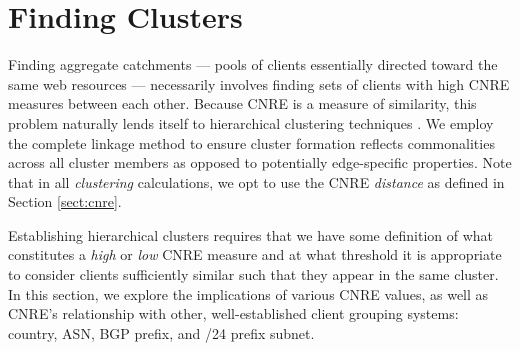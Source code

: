 
\begin{figure*}
    \caption{Dendrogram of CNRE distance across all client pairs}
\end{figure*}

\section{Finding Clusters} \label{sect:finding}

Finding aggregate catchments --- pools of clients essentially directed toward
the same web resources --- necessarily involves finding sets of clients with high
CNRE measures between each other. Because CNRE is a measure of similarity, this
problem naturally lends itself to hierarchical clustering techniques \cite{murtagh1983survey}. 
We employ the complete linkage method to ensure cluster formation reflects commonalities
across all cluster members as opposed to potentially edge-specific properties.
Note that in all \emph{clustering} calculations, we opt to use the CNRE \emph{distance}
as defined in Section \ref{sect:cnre}.

Establishing hierarchical clusters requires that we have some definition of what
constitutes a \emph{high} or \emph{low} CNRE measure and at what threshold it is
appropriate to consider clients sufficiently similar such that they appear in
the same cluster. In this section, we explore the implications of various CNRE
values, as well as CNRE's relationship with other, well-established client grouping
systems: country, ASN, BGP prefix, and /24 prefix subnet.





